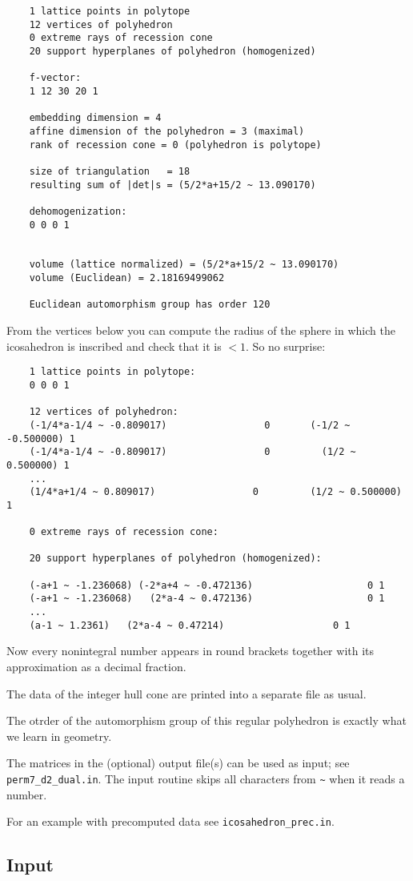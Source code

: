 \documentclass[12pt,a4paper]{scrartcl}
\theoremstyle{definition}
\begin{document}
{	\begin{Verbatim}
	1 lattice points in polytope
	12 vertices of polyhedron
	0 extreme rays of recession cone
	20 support hyperplanes of polyhedron (homogenized)
	
	f-vector:
	1 12 30 20 1 
	
	embedding dimension = 4
	affine dimension of the polyhedron = 3 (maximal)
	rank of recession cone = 0 (polyhedron is polytope)
	
	size of triangulation   = 18
	resulting sum of |det|s = (5/2*a+15/2 ~ 13.090170)
	
	dehomogenization:
	0 0 0 1 
	
	
	volume (lattice normalized) = (5/2*a+15/2 ~ 13.090170)
	volume (Euclidean) = 2.18169499062
	
	Euclidean automorphism group has order 120
	\end{Verbatim}
	From the vertices below you can compute the radius of the sphere in which the icosahedron is inscribed and check that it is $<1$. So no surprise:
	\begin{Verbatim}
	1 lattice points in polytope:
	0 0 0 1
	
	12 vertices of polyhedron:
	(-1/4*a-1/4 ~ -0.809017)                 0       (-1/2 ~ -0.500000) 1
	(-1/4*a-1/4 ~ -0.809017)                 0         (1/2 ~ 0.500000) 1
	...
	(1/4*a+1/4 ~ 0.809017)                 0         (1/2 ~ 0.500000) 1
	
	0 extreme rays of recession cone:
	
	20 support hyperplanes of polyhedron (homogenized):
	
	(-a+1 ~ -1.236068) (-2*a+4 ~ -0.472136)                    0 1
	(-a+1 ~ -1.236068)   (2*a-4 ~ 0.472136)                    0 1
	...
	(a-1 ~ 1.2361)   (2*a-4 ~ 0.47214)                   0 1
	\end{Verbatim}
	Now every nonintegral number appears in round brackets together with its approximation as a decimal fraction.
	
	The data of the integer hull cone are printed into a separate file as usual.
	
	The otrder of the automorphism group of this regular polyhedron is exactly what we learn in geometry.
	
	The matrices in the (optional) output file(s) can be used as input; see \verb|perm7_d2_dual.in|. The input routine skips all characters from \verb|~| when it reads a number. 
	
	For an example with precomputed data see \verb|icosahedron_prec.in|.
	\subsection{Input}}\label{alg_inp}
\end{document}

